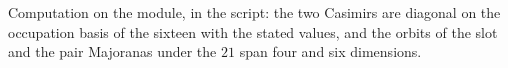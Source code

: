 Computation on the module, in the script: the two Casimirs are diagonal on the occupation basis of the sixteen with the stated values, and the orbits of the slot and the pair Majoranas under the $21$ span four and six dimensions.
